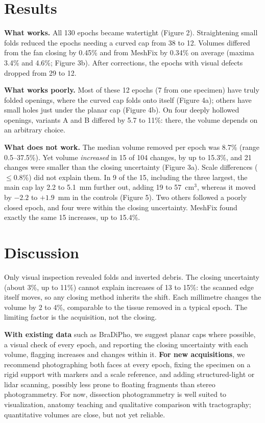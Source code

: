 \documentclass[11pt]{article}
\begin{document}
\section*{Results}

\textbf{What works.} All 130 epochs became watertight (Figure 2).
Straightening small folds reduced the epochs needing a curved cap from 38 to
12. Volumes differed from the fan closing by 0.45\% and from MeshFix by
0.34\% on average (maxima 3.4\% and 4.6\%; Figure 3b).
After corrections, the epochs with visual defects dropped from 29 to 12.

\textbf{What works poorly.} Most of these 12 epochs (7 from one specimen)
have truly folded openings, where the curved cap folds onto itself
(Figure 4a); others have small holes just under the planar cap (Figure 4b).
On four deeply hollowed openings, variants A and B differed by 5.7 to 11\%:
there, the volume depends on an arbitrary choice.

\textbf{What does not work.} The median volume removed per epoch was 8.7\%
(range 0.5--37.5\%). Yet volume \emph{increased} in 15 of 104 changes, by up
to 15.3\%, and 21 changes were smaller than the closing uncertainty
(Figure 3a). Scale differences ($\leq$0.8\%) did not explain
them. In 9 of the 15, including the three largest, the main cap lay
2.2 to 5.1~mm further out, adding 19 to 57~cm$^3$, whereas it moved by
$-2.2$ to $+1.9$~mm in the controls (Figure 5). Two others followed a
poorly closed epoch, and four were within the closing uncertainty. MeshFix
found exactly the same 15 increases, up to 15.4\%.

\section*{Discussion}

Only visual inspection revealed folds and inverted debris. The closing uncertainty (about 3\%, up to 11\%) cannot
explain increases of 13 to 15\%: the scanned edge itself moves, so any
closing method inherits the shift. Each millimetre changes the volume by 2 to
4\%, comparable to the tissue removed in a typical epoch. The limiting factor
is the acquisition, not the closing.

\textbf{With existing data} such as BraDiPho, we suggest planar caps where
possible, a visual check of every epoch, and reporting the closing
uncertainty with each volume, flagging increases and changes within it. \textbf{For new acquisitions},
we recommend photographing both faces at every epoch, fixing the specimen on
a rigid support with markers and a scale reference, and adding
structured-light or lidar scanning, possibly less prone to floating fragments
than stereo photogrammetry. For now, dissection photogrammetry is well suited to
visualization, anatomy teaching and qualitative comparison with tractography;
quantitative volumes are close, but not yet reliable.
\end{document}
